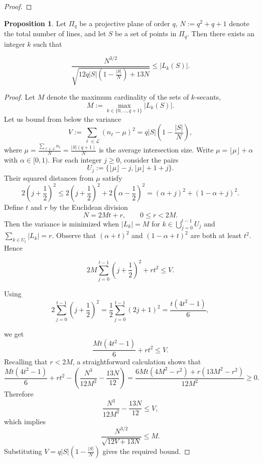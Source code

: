 \documentclass[10pt]{article}
\newcommand{\cL}{\mathcal{L}}
\theoremstyle{definition}
\newtheorem{proposition}[thm]{Proposition}
\begin{document}
\begin{appendices}
\begin{proof}
		\end{proof}
		
		
		\begin{proposition}\label{prop:general_lower_bound}
			Let $\Pi_q$ be a projective plane of order $q$,   $N:=q^2+q+1$ denote the total number of lines,  and let $S$ be a set of points in $\Pi_q$. Then there exists an integer $k$ such that
			
			\[
			\frac{N^{3/2}}{\sqrt{12q|S|(1-\frac{|S|}{N}) + { {13N}} }}
			\le |L_k(S)|.
			\]
		\end{proposition}
		\begin{proof}
			Let $M$ denote the maximum cardinality of the sets of $k$-secants,
			\[
			M:=\max_{k\in\{0,\dots,q+1\}} |L_k(S)|.
			\]   Let us bound from below the variance \[V:=
			\sum_{\ell\in \cL}(n_{\ell}-\mu)^2
			=q|S|\left(1-\frac{|S|}{N}\right),
			\] where $\mu=\frac{\sum_{\ell\in \cL}n_{\ell}}{N}=\frac{|S|(q+1)}{N}$ is the average intersection size.
			Write $\mu=\lfloor\mu\rfloor+\alpha$ with $\alpha\in[0,1)$.
			For each integer \(j\ge 0\), consider the pairs 
			$$U_j:=\{
			\lfloor\mu\rfloor-j,\lfloor\mu\rfloor+1+j
			\}.$$
			Their squared distances from $\mu$ satisfy
			\[
			\ensuremath{2\left(j+\frac12\right)^2
				\le 2\left(j+\frac12\right)^2+2\left(\alpha-\frac12\right)^2
				=(\alpha+j)^2+(1-\alpha+j)^2}.
			\]
			Define $t$ and $r$ by the Euclidean division
			\[
			N=2Mt+r,\qquad 0\le r<2M.
			\]
			Then the variance is minimized when $|L_k|=M$ for $k\in \bigcup_{j=0}^{t-1} U_j$
			and $\sum_{k\in U_{t}} |L_k|=r$. Observe that $(\alpha+t)^2$ and  $(1-\alpha+t)^2$ are both at least $t^2$.
			Hence
			
			\[
			2M\sum_{j=0}^{t-1}\left(j+\frac12\right)^2
			+
			rt^2 \le V.
			\]
			
			Using
			\[
			2\sum_{j=0}^{t-1}\left(j+\frac12\right)^2
			= \frac{1}{2}\sum_{j=0}^{t-1}(2j+1)^2= 
			\frac{t(4t^2-1)}{6},
			\]
			
			we get
			\[
			\frac{Mt(4t^2-1)}{6}
			+
			rt^2 \le V.
			\]
			Recalling that \(r<2M\), a straightforward calculation shows that
			\[
			\frac{Mt(4t^2-1)}{6}
			+
			rt^2
			-
			\left(\frac{N^3}{12M^2}-\frac{13N}{12}\right)
			=
			\ensuremath{\frac{ 6Mt(4M^2-r^2)  + r(13M^2- r^2)}{12M^2} \ge 0}.
			\]
			Therefore
			\[
			\frac{N^3}{12M^2}-\frac{13N}{12} \le V,
			\]
			which implies
			\[
			\frac{N^{3/2}}{\sqrt{12V+13N}} \le M.
			\]
			Substituting $
			V=q|S|\left(1-\frac{|S|}{N}\right)$
			gives the required bound.\end{proof}
		

\end{appendices}
\end{document}
